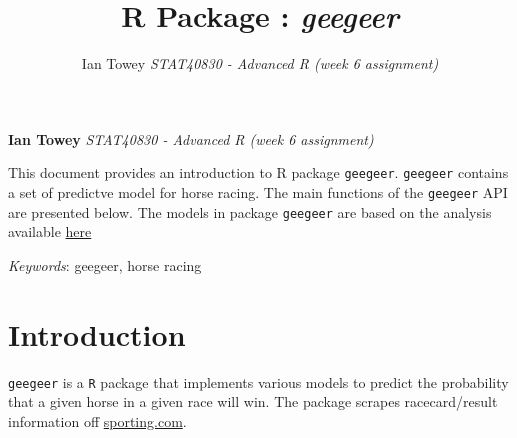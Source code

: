 \documentclass[11pt,]{article}
\title{R Package : \emph{geegeer}  }
\author{\Large Ian Towey\vspace{0.05in} \newline\normalsize\emph{STAT40830 - Advanced R (week 6 assignment)}  }
\date{}
\newcommand*{\authorfont}{\fontfamily{phv}\selectfont}
\renewenvironment{abstract}
 {{%
    \setlength{\leftmargin}{0mm}
    \setlength{\rightmargin}{\leftmargin}%
  }%
  \relax}
 {\endlist}
\begin{document}
	
%

{%
\setlength{\parindent}{0pt}
\thispagestyle{plain}
{\fontsize{18}{20}\selectfont\raggedright 
\maketitle  %

}

{
   \vskip 13.5pt\relax \normalsize\fontsize{11}{12} 
\textbf{\authorfont Ian Towey} \hskip 15pt \emph{\small STAT40830 - Advanced R (week 6 assignment)}   

}

}







\begin{abstract}

    \hbox{\vrule height .2pt width 39.14pc}

    \vskip 8.5pt %

\noindent This document provides an introduction to R package \texttt{geegeer}.
\texttt{geegeer} contains a set of predictve model for horse racing. The
main functions of the \texttt{geegeer} API are presented below. The
models in package \texttt{geegeer} are based on the analysis available
\href{http://www.ms.unimelb.edu.au/documents/thesis/AlexThesis.pdf}{here}


\vskip 8.5pt \noindent \emph{Keywords}: geegeer, horse racing \par

    \hbox{\vrule height .2pt width 39.14pc}



\end{abstract}


\vskip 6.5pt

\noindent  \section{Introduction}\label{introduction}

\texttt{geegeer} is a \texttt{R} package that implements various models
to predict the probability that a given horse in a given race will win.
The package scrapes racecard/result information off
\href{http://www.sportinglife.com/racing}{sporting.com}.
\end{document}

